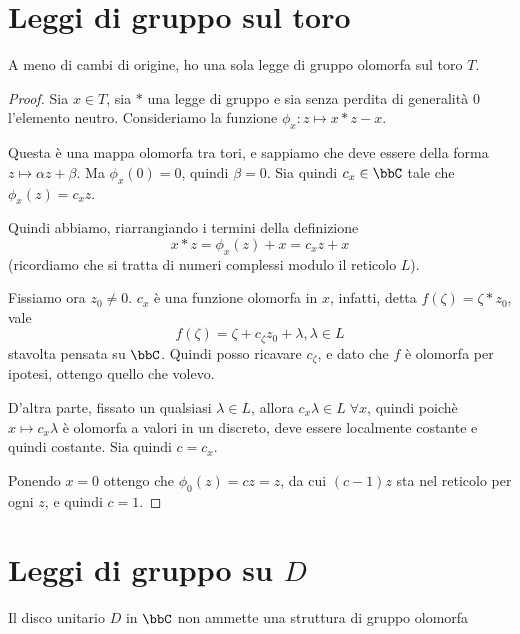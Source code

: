 \section{Leggi di gruppo sul toro}

\begin{proposizione}
A meno di cambi di origine, ho una sola legge di gruppo olomorfa sul toro $T$.
\end{proposizione}

\begin{proof}
Sia $x \in T$, sia $*$ una legge di gruppo e sia senza perdita di generalità $0$ l'elemento neutro. Consideriamo la funzione $\phi_x: z \mapsto x * z - x$.

Questa è una mappa olomorfa tra tori, e sappiamo che deve essere della forma $z \mapsto \alpha z + \beta$. Ma $\phi_x(0)=0$, quindi $\beta=0$. Sia quindi $c_x \in \bbC$ tale che $\phi_x(z)=c_xz$.

Quindi abbiamo, riarrangiando i termini della definizione
\[
 x*z = \phi_x(z) + x = c_xz + x
\]
(ricordiamo che si tratta di numeri complessi modulo il reticolo $L$).

Fissiamo ora $z_0\ne 0$. $c_x$ è una funzione olomorfa in $x$, infatti, detta $f(\zeta) = \zeta * z_0$, vale
\[
    f(\zeta) = \zeta + c_\zeta z_0 + \lambda, \lambda \in L
\]
stavolta pensata su $\bbC$. Quindi posso ricavare $c_\zeta$, e dato che $f$ è olomorfa per ipotesi, ottengo quello che volevo.

D'altra parte, fissato un qualsiasi $\lambda \in L$, allora $c_x\lambda \in L \; \forall x$, quindi poichè $x \mapsto c_x \lambda$ è olomorfa a valori in un discreto, deve essere localmente costante e quindi costante. Sia quindi $c=c_x$.

Ponendo $x=0$ ottengo che $\phi_0(z) = cz = z$, da cui $(c-1)z$ sta nel reticolo per ogni $z$, e quindi $c=1$.

\end{proof}

\section{Leggi di gruppo su $D$}

\begin{teorema}
Il disco unitario $D$ in $\bbC$ non ammette una struttura di gruppo olomorfa
\end{teorema}

